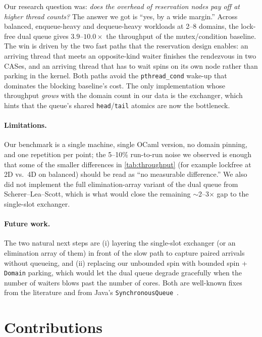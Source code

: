 \documentclass[11pt,a4paper]{article}
\begin{document}
Our research question was: \emph{does the overhead of reservation
nodes pay off at higher thread counts?} The answer we got is
``yes, by a wide margin.'' Across balanced, enqueue-heavy and
dequeue-heavy workloads at 2--8 domains, the lock-free dual queue
gives $3.9$--$10.0\times$ the throughput of the mutex/condition
baseline. The win is driven by the two fast paths that the
reservation design enables: an arriving thread that meets an
opposite-kind waiter finishes the rendezvous in two CASes, and an
arriving thread that has to wait spins on its own node rather than
parking in the kernel. Both paths avoid the \texttt{pthread\_cond}
wake-up that dominates the blocking baseline's cost. The only
implementation whose throughput \emph{grows} with the domain count
in our data is the exchanger, which hints that the queue's shared
\texttt{head}/\texttt{tail} atomics are now the bottleneck.

\paragraph{Limitations.}
Our benchmark is a single machine, single OCaml version, no domain
pinning, and one repetition per point; the 5--10\% run-to-run noise
we observed is enough that some of the smaller differences in
\cref{tab:throughput} (for example lockfree at 2D vs.\ 4D on
balanced) should be read as ``no measurable difference.'' We also
did not implement the full elimination-array variant of the dual
queue from Scherer--Lea--Scott, which is what would close the
remaining $\sim$2--3$\times$ gap to the single-slot exchanger.

\paragraph{Future work.}
The two natural next steps are (i) layering the single-slot
exchanger (or an elimination array of them) in front of the slow
path to capture paired arrivals without queueing, and (ii)
replacing our unbounded spin with bounded spin + \texttt{Domain}
parking, which would let the dual queue degrade gracefully when the
number of waiters blows past the number of cores. Both are
well-known fixes from the literature and from Java's
\texttt{SynchronousQueue}~\cite{javasynchronousqueue}.

\section*{Contributions}
\label{sec:contributions}
\end{document}
